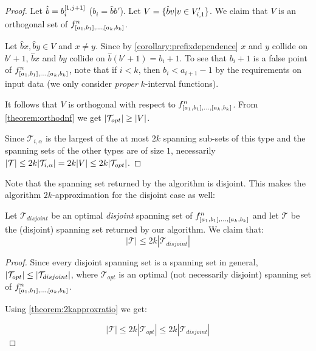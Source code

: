 \begin{proof}
Let $\hat{b} = b_i^{[1, j+1]}$ ($b_i = \hat{b} b'$).
Let $V = \{\hat{b} v | v \in V_{i, 1}'\}$.
We claim that $V$ is an orthogonal set of
$f^{n}_{[a_1, b_1], \ldots, [a_{k}, b_{k}]}$.

Let $\hat{b} x, \hat{b} y \in V$
and $x \neq y$.
Since by \cref{corollary:prefixdependence}
$x$ and $y$ collide on $b'+1$,
$\hat{b} x$ and $\hat{b} y$
collide on
$\hat{b} (b'+1) = b_i+1$.
To see that $b_i+1$ is a false point of $f^{n}_{[a_1, b_1], \ldots, [a_{k}, b_{k}]}$,
note that if $i<k$,
then $b_i < a_{i+1} - 1$
by the requirements on input data
(we only consider \emph{proper} $k$-interval functions).

It follows that $V$ is orthogonal
with respect to $f^{n}_{[a_1, b_1], \ldots, [a_{k}, b_{k}]}$.
From \autoref{theorem:orthodnf} we get
$\lvert\mathcal{T}_{opt}\rvert \geq \lvert V\rvert$.

Since $\mathcal{T}_{i, \alpha}$ is
the largest of the at most $2k$ spanning sub-sets
of this type
and the spanning sets of the other types are of size $1$,
necessarily
$\lvert\mathcal{T}\rvert \leq 2k \lvert\mathcal{T}_{i, \alpha}\rvert
= 2k \lvert V\rvert \leq 2k \lvert\mathcal{T}_{opt}\rvert$.
\end{proof}

Note that the spanning set returned by the algorithm
is disjoint.
This makes the algorithm $2k$-approximation
for the disjoint case as well:

\begin{theorem}
Let $\mathcal{T}_{disjoint}$ be an optimal \emph{disjoint}
spanning set of
$f^n_{[a_1, b_1], \ldots, [a_k, b_k]}$
and let $\mathcal{T}$ be the (disjoint)
spanning set returned by our algorithm.
We claim that:
\begin{equation*}
|\mathcal{T}| \leq 2k |\mathcal{T}_{disjoint}|
\end{equation*}
\end{theorem}

\begin{proof}
Since every disjoint spanning set
is a spanning set in general,
$\lvert\mathcal{T}_{opt}\rvert \leq
\lvert\mathcal{T}_{disjoint}\rvert$,
where $\mathcal{T}_{opt}$ is an optimal
(not necessarily disjoint)
spanning set of
$f^n_{[a_1, b_1], \ldots, [a_k, b_k]}$.

Using \autoref{theorem:2kapproxratio} we get:

\begin{equation*}
|\mathcal{T}| \leq 2k |\mathcal{T}_{opt}|
\leq 2k |\mathcal{T}_{disjoint}|
\end{equation*}
\end{proof}

